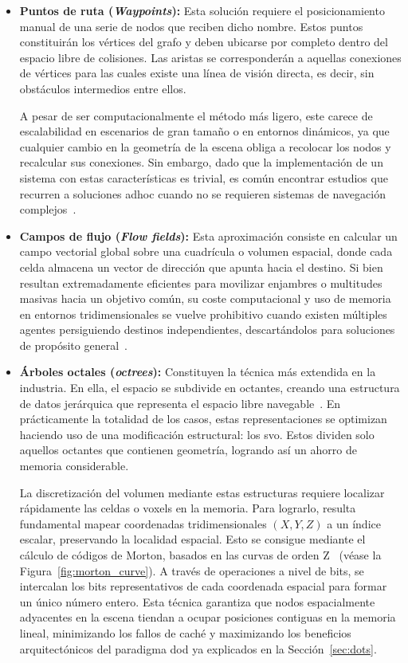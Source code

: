\begin{itemize}
    \item \textbf{Puntos de ruta (\textit{Waypoints}):} Esta solución requiere el posicionamiento manual de una serie de nodos que reciben dicho nombre.
    Estos puntos constituirán los vértices del grafo y deben ubicarse por completo dentro del espacio libre de colisiones.
    Las aristas se corresponderán a aquellas conexiones de vértices para las cuales existe una línea de visión directa, es decir, sin obstáculos intermedios entre ellos.
    
    A pesar de ser computacionalmente el método más ligero, este carece de escalabilidad en escenarios de gran tamaño o en entornos dinámicos, ya que cualquier cambio en la geometría de la escena obliga a recolocar los nodos y recalcular sus conexiones.
    Sin embargo, dado que la implementación de un sistema con estas características es trivial, es común encontrar estudios que recurren a soluciones \gls{adhoc} cuando no se requieren sistemas de navegación complejos~\cite{Millington}.
    \item \textbf{Campos de flujo (\textit{Flow fields}):} Esta aproximación consiste en calcular un campo vectorial global sobre una cuadrícula o volumen espacial, donde cada celda almacena un vector de dirección que apunta hacia el destino. 
    Si bien resultan extremadamente eficientes para movilizar enjambres o multitudes masivas hacia un objetivo común, su coste computacional y uso de memoria en entornos tridimensionales se vuelve prohibitivo cuando existen múltiples agentes persiguiendo destinos independientes, descartándolos para soluciones de propósito general~\cite{emerson2019crowd}.
    \item \textbf{Árboles octales (\textit{\Glspl{octree}}):} Constituyen la técnica más extendida en la industria.
    En ella, el espacio se subdivide en octantes, creando una estructura de datos jerárquica que representa el espacio libre navegable~\cite{octree}.
    En prácticamente la totalidad de los casos, estas representaciones se optimizan haciendo uso de una modificación estructural: los \acrfull{svo}.
    Estos dividen solo aquellos octantes que contienen geometría, logrando así un ahorro de memoria considerable.
    
    La discretización del volumen mediante estas estructuras requiere localizar rápidamente las celdas o \glspl{voxel} en la memoria.
    Para lograrlo, resulta fundamental mapear coordenadas tridimensionales $(X, Y, Z)$ a un índice escalar, preservando la localidad espacial.
    Esto se consigue mediante el cálculo de códigos de Morton, basados en las curvas de orden Z~\cite{morton} (véase la Figura~\ref{fig:morton_curve}).
    A través de operaciones a nivel de bits, se intercalan los bits representativos de cada coordenada espacial para formar un único número entero.
    Esta técnica garantiza que nodos espacialmente adyacentes en la escena tiendan a ocupar posiciones contiguas en la memoria lineal, minimizando los fallos de caché y maximizando los beneficios arquitectónicos del paradigma \acrshort{dod} ya explicados en la Sección~\ref{sec:dots}.


\end{itemize}
